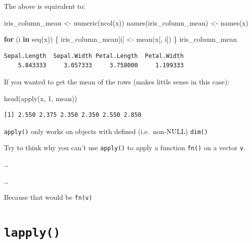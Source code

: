 \documentclass[
]{book}
\makeatletter
\newenvironment{Shaded}{\begin{snugshade}}{\end{snugshade}}
\newcommand{\ControlFlowTok}[1]{\textcolor[rgb]{0.13,0.29,0.53}{\textbf{#1}}}
\newcommand{\DecValTok}[1]{\textcolor[rgb]{0.00,0.00,0.81}{#1}}
\newcommand{\FunctionTok}[1]{\textcolor[rgb]{0.00,0.00,0.00}{#1}}
\newcommand{\NormalTok}[1]{#1}
\newcommand{\OtherTok}[1]{\textcolor[rgb]{0.56,0.35,0.01}{#1}}
\newenvironment{kframe}{%
\medskip{}
\setlength{\fboxsep}{.8em}
 \def\at@end@of@kframe{}%
 \ifinner\ifhmode%
  \def\at@end@of@kframe{\end{minipage}}%
  \begin{minipage}{\columnwidth}%
 \fi\fi%
 \def\FrameCommand##1{\hskip\@totalleftmargin \hskip-\fboxsep
 \colorbox{shadecolor}{##1}\hskip-\fboxsep
     \hskip-\linewidth \hskip-\@totalleftmargin \hskip\columnwidth}%
 \MakeFramed {\advance\hsize-\width
   \@totalleftmargin\z@ \linewidth\hsize
   \@setminipage}}%
 {\par\unskip\endMakeFramed%
 \at@end@of@kframe}
\newenvironment{rmdblock}[1]
  {
  \begin{itemize}
  \renewcommand{\labelitemi}{
    \raisebox{-.7\height}[0pt][0pt]{
      {\setkeys{Gin}{width=3em,keepaspectratio}\texttt{[image: images/\#1]}}
    }
  }
  \setlength{\fboxsep}{1em}
  \begin{kframe}
  \item
  }
  {
  \end{kframe}
  \end{itemize}
  }
\newenvironment{note}
  {\begin{rmdblock}{note}}
  {\end{rmdblock}}
\makeatother
\begin{document}
The above is equivalent to:

\begin{Shaded}
\begin{Highlighting}[]
\NormalTok{iris\_column\_mean }\OtherTok{\textless{}{-}} \FunctionTok{numeric}\NormalTok{(}\FunctionTok{ncol}\NormalTok{(x))}
\FunctionTok{names}\NormalTok{(iris\_column\_mean) }\OtherTok{\textless{}{-}} \FunctionTok{names}\NormalTok{(x)}

\ControlFlowTok{for}\NormalTok{ (i }\ControlFlowTok{in} \FunctionTok{seq}\NormalTok{(x)) \{}
\NormalTok{  iris\_column\_mean[i] }\OtherTok{\textless{}{-}} \FunctionTok{mean}\NormalTok{(x[, i])}
\NormalTok{\}}
\NormalTok{iris\_column\_mean}
\end{Highlighting}
\end{Shaded}

\begin{verbatim}
Sepal.Length  Sepal.Width Petal.Length  Petal.Width 
    5.843333     3.057333     3.758000     1.199333 
\end{verbatim}

If you wanted to get the mean of the rows (makes little sense in this case):

\begin{Shaded}
\begin{Highlighting}[]
\FunctionTok{head}\NormalTok{(}\FunctionTok{apply}\NormalTok{(x, }\DecValTok{1}\NormalTok{, mean))}
\end{Highlighting}
\end{Shaded}

\begin{verbatim}
[1] 2.550 2.375 2.350 2.350 2.550 2.850
\end{verbatim}

\begin{note}
\texttt{apply()} only works on objects with defined (i.e.~non-NULL)
\texttt{dim()}
\end{note}

\begin{None}
Try to think why you can't use \texttt{apply()} to apply a function
\texttt{fn()} on a vector \texttt{v}.

\ldots{}

\ldots{}

Because that would be \texttt{fn(v)}
\end{None}

\hypertarget{lapply}{%
\section{\texorpdfstring{\texttt{lapply()}}{lapply()}}\label{lapply}}
\end{document}
